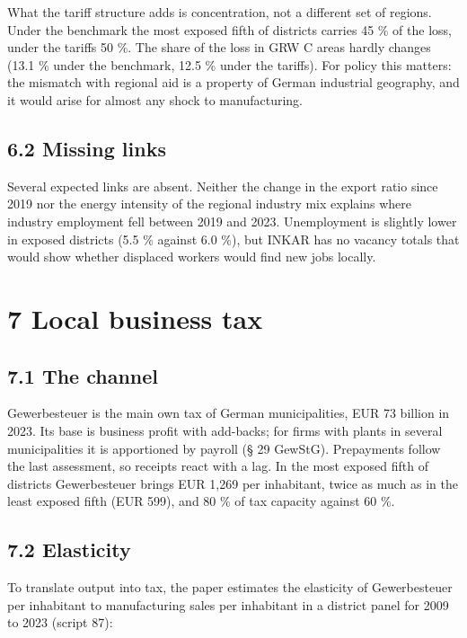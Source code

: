 \documentclass[
  11pt,
]{article}
\begin{document}
What the tariff structure adds is concentration, not a different set of
regions. Under the benchmark the most exposed fifth of districts carries
45 \% of the loss, under the tariffs 50 \%. The share of the loss in GRW
C areas hardly changes (13.1 \% under the benchmark, 12.5 \% under the
tariffs). For policy this matters: the mismatch with regional aid is a
property of German industrial geography, and it would arise for almost
any shock to manufacturing.

\hypertarget{missing-links}{%
\subsection{6.2 Missing links}\label{missing-links}}

Several expected links are absent. Neither the change in the export
ratio since 2019 nor the energy intensity of the regional industry mix
explains where industry employment fell between 2019 and 2023.
Unemployment is slightly lower in exposed districts (5.5 \% against 6.0
\%), but INKAR has no vacancy totals that would show whether displaced
workers would find new jobs locally.

\hypertarget{local-business-tax}{%
\section{7 Local business tax}\label{local-business-tax}}

\hypertarget{the-channel}{%
\subsection{7.1 The channel}\label{the-channel}}

Gewerbesteuer is the main own tax of German municipalities, EUR 73
billion in 2023. Its base is business profit with add-backs; for firms
with plants in several municipalities it is apportioned by payroll (§ 29
GewStG). Prepayments follow the last assessment, so receipts react with
a lag. In the most exposed fifth of districts Gewerbesteuer brings EUR
1,269 per inhabitant, twice as much as in the least exposed fifth (EUR
599), and 80 \% of tax capacity against 60 \%.

\hypertarget{elasticity}{%
\subsection{7.2 Elasticity}\label{elasticity}}

To translate output into tax, the paper estimates the elasticity of
Gewerbesteuer per inhabitant to manufacturing sales per inhabitant in a
district panel for 2009 to 2023 (script 87):
\end{document}
